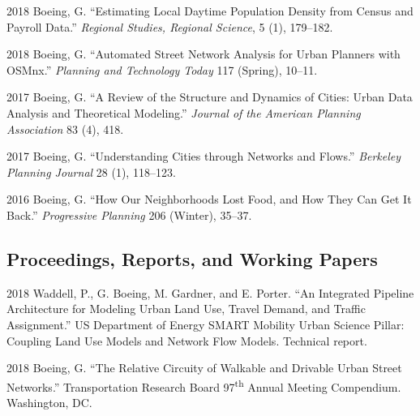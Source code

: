 \documentclass{academiccv}
\begin{document}
\begin{tablist}
	
\item[2018] \tab Boeing, G. \enquote{Estimating Local Daytime Population Density from Census and Payroll Data.} \textit{Regional Studies, Regional Science}, 5 (1), 179--182.

\item[2018] \tab Boeing, G. \enquote{Automated Street Network Analysis for Urban Planners with OSMnx.} \textit{Planning and Technology Today} 117 (Spring), 10--11.
	
\item[2017] \tab Boeing, G. \enquote{A Review of the Structure and Dynamics of Cities: Urban Data Analysis and Theoretical Modeling.} \textit{Journal of the American Planning Association} 83 (4), 418.
	
\item[2017] \tab Boeing, G. \enquote{Understanding Cities through Networks and Flows.} \textit{Berkeley Planning Journal} 28 (1), 118--123.

\item[2016] \tab Boeing, G. \enquote{How Our Neighborhoods Lost Food, and How They Can Get It Back.} \textit{Progressive Planning} 206 (Winter), 35--37.
	
\end{tablist}



\subsection*{Proceedings, Reports, and Working Papers}

\begin{tablist}

\item[2018] \tab Waddell, P., G. Boeing, M. Gardner, and E. Porter. \enquote{An Integrated Pipeline Architecture for Modeling Urban Land Use, Travel Demand, and Traffic Assignment.} US Department of Energy SMART Mobility Urban Science Pillar: Coupling Land Use Models and Network Flow Models. Technical report.

\item[2018] \tab Boeing, G. \enquote{The Relative Circuity of Walkable and Drivable Urban Street Networks.} Transportation Research Board 97\textsuperscript{th} Annual Meeting Compendium. Washington, DC.
	
\end{tablist}
\end{document}
